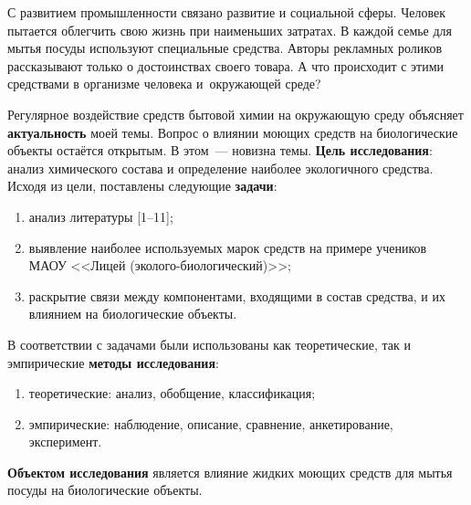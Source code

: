 


\makeProcTitleSchool



С развитием промышленности связано развитие и социальной сферы. Человек пытается облегчить свою жизнь при наименьших затратах. В каждой семье для мытья посуды используют специальные средства. Авторы рекламных роликов рассказывают только о достоинствах своего товара. А что происходит с этими средствами в организме человека и~окружающей среде?

Регулярное воздействие средств бытовой химии на окружающую среду объясняет \textbf{актуальность} моей темы. Вопрос о влиянии моющих средств на биологические объекты остаётся открытым. В этом~--- новизна темы. \textbf{Цель исследования}: анализ химического состава и определение наиболее экологичного средства. Исходя из цели, поставлены следующие \textbf{задачи}:

\begin{enumerate}[noitemsep]\vspace{-8pt}
\item анализ литературы [1--11];
\item выявление наиболее используемых марок средств на примере учеников МАОУ <<Лицей (эколого-биологический)>>;
\item раскрытие связи между компонентами, входящими в состав средства, и их влиянием на биологические объекты.
\end{enumerate}\vspace{-8pt}

В соответствии с задачами были использованы как теоретические, так и эмпирические \textbf{методы исследования}:
\begin{enumerate}[noitemsep]\vspace{-8pt}
\item теоретические: анализ, обобщение, классификация;
\item эмпирические: наблюдение, описание, сравнение, анкетирование, эксперимент.
\end{enumerate}\vspace{-8pt}

\textbf{Объектом исследования} является влияние жидких моющих средств для мытья посуды на биологические объекты.

